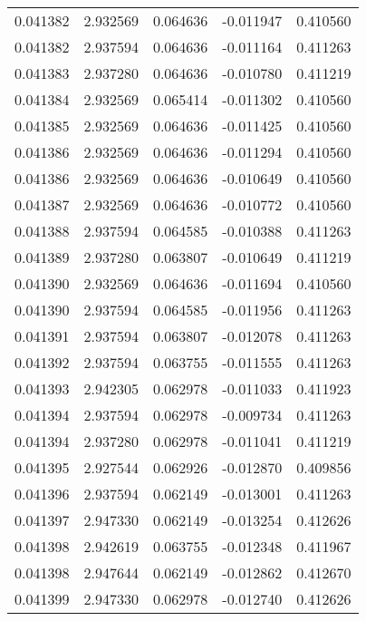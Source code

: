 \begin{tabular}{lrrrr}
0.041382    &  2.932569 &  0.064636 & -0.011947 &             0.410560 \\
0.041382    &  2.937594 &  0.064636 & -0.011164 &             0.411263 \\
0.041383    &  2.937280 &  0.064636 & -0.010780 &             0.411219 \\
0.041384    &  2.932569 &  0.065414 & -0.011302 &             0.410560 \\
0.041385    &  2.932569 &  0.064636 & -0.011425 &             0.410560 \\
0.041386    &  2.932569 &  0.064636 & -0.011294 &             0.410560 \\
0.041386    &  2.932569 &  0.064636 & -0.010649 &             0.410560 \\
0.041387    &  2.932569 &  0.064636 & -0.010772 &             0.410560 \\
0.041388    &  2.937594 &  0.064585 & -0.010388 &             0.411263 \\
0.041389    &  2.937280 &  0.063807 & -0.010649 &             0.411219 \\
0.041390    &  2.932569 &  0.064636 & -0.011694 &             0.410560 \\
0.041390    &  2.937594 &  0.064585 & -0.011956 &             0.411263 \\
0.041391    &  2.937594 &  0.063807 & -0.012078 &             0.411263 \\
0.041392    &  2.937594 &  0.063755 & -0.011555 &             0.411263 \\
0.041393    &  2.942305 &  0.062978 & -0.011033 &             0.411923 \\
0.041394    &  2.937594 &  0.062978 & -0.009734 &             0.411263 \\
0.041394    &  2.937280 &  0.062978 & -0.011041 &             0.411219 \\
0.041395    &  2.927544 &  0.062926 & -0.012870 &             0.409856 \\
0.041396    &  2.937594 &  0.062149 & -0.013001 &             0.411263 \\
0.041397    &  2.947330 &  0.062149 & -0.013254 &             0.412626 \\
0.041398    &  2.942619 &  0.063755 & -0.012348 &             0.411967 \\
0.041398    &  2.947644 &  0.062149 & -0.012862 &             0.412670 \\
0.041399    &  2.947330 &  0.062978 & -0.012740 &             0.412626 \\

\end{tabular}
